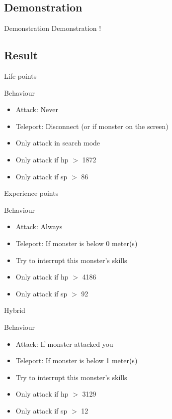 \subsection{Demonstration}

\begin{frame}{Demonstration}
  Demonstration !
\end{frame}

\subsection{Result}

\begin{frame}{Life points}
  \begin{block}{Behaviour}
    \begin{itemize}
    \item Attack: Never
    \item Teleport: Disconnect (or if monster on the screen)
    \item Only attack in search mode
    \item Only attack if hp $>$ 1872
    \item Only attack if sp $>$ 86
    \end{itemize}
  \end{block}
\end{frame}

\begin{frame}{Experience points}
  \begin{block}{Behaviour}
    \begin{itemize}
    \item Attack: Always
    \item Teleport: If monster is below 0 meter(s)
    \item Try to interrupt this monster's skills
    \item Only attack if hp $>$ 4186
    \item Only attack if sp $>$ 92
    \end{itemize}
  \end{block}
\end{frame}

\begin{frame}{Hybrid}
  \begin{block}{Behaviour}
    \begin{itemize}
    \item Attack: If monster attacked you
    \item Teleport: If monster is below 1 meter(s)
    \item Try to interrupt this monster's skills
    \item Only attack if hp $>$ 3129
    \item Only attack if sp $>$ 12
    \end{itemize}
  \end{block}
\end{frame}
